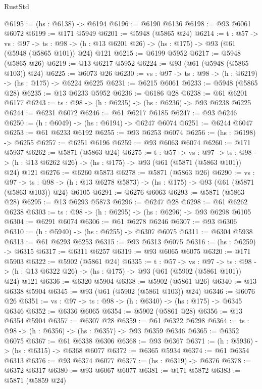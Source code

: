 \begin{lexlean}{RustStd}
\begin{coremodule}
@6195 := (hs : @6138) -> @6194
@6196 := @6190 @6136
@6198 := @93 @6061 @6072
@6199 := @171 @5949
@6201 := @5948 (@5865 @24)
@6214 := {t : @57} ->
  {vs : @97} ->
  {ts : @98} -> (h : @13 @6201 @26) -> (hs : @175) -> @93 (@61 (@5948 (@5865 @101)) @24) @121
@6215 := @6199 @5952
@6217 := @5948 (@5865 @26)
@6219 := @13 @6217 @5952
@6224 := @93 (@61 (@5948 (@5865 @103)) @24)
@6225 := @6073 @26
@6230 := {vs : @97} -> {ts : @98} -> (h : @6219) -> (hs : @175) -> @6224 @6225
@6231 := @6215 @6061
@6233 := @5948 (@5865 @28)
@6235 := @13 @6233 @5952
@6236 := @6186 @28
@6238 := @61 @6201 @6177
@6243 := {ts : @98} -> (h : @6235) -> (hs : @6236) -> @93 @6238 @6225
@6244 := @6231 @6072
@6246 := @61 @6217 @6185
@6247 := @93 @6246
@6250 := (h : @6049) -> (hs : @6194) -> @6247 @6074
@6251 := @6244 @6047
@6253 := @61 @6233 @6192
@6255 := @93 @6253 @6074
@6256 := (hs : @6198) -> @6255
@6257 := @6251 @6196
@6259 := @93 @6063 @6074
@6260 := @171 @5937
@6262 := @5871 (@5863 @24)
@6275 := {t : @57} ->
  {vs : @97} ->
  {ts : @98} -> (h : @13 @6262 @26) -> (hs : @175) -> @93 (@61 (@5871 (@5863 @101)) @24) @121
@6276 := @6260 @5873
@6278 := @5871 (@5863 @26)
@6290 := {vs : @97} ->
  {ts : @98} -> (h : @13 @6278 @5873) -> (hs : @175) -> @93 (@61 (@5871 (@5863 @103)) @24) @6105
@6291 := @6276 @6063
@6293 := @5871 (@5863 @28)
@6295 := @13 @6293 @5873
@6296 := @6247 @28
@6298 := @61 @6262 @6238
@6303 := {ts : @98} -> (h : @6295) -> (hs : @6296) -> @93 @6298 @6105
@6304 := @6291 @6074
@6306 := @61 @6278 @6246
@6307 := @93 @6306
@6310 := (h : @5940) -> (hs : @6255) -> @6307 @6075
@6311 := @6304 @5938
@6313 := @61 @6293 @6253
@6315 := @93 @6313 @6075
@6316 := (hs : @6259) -> @6315
@6317 := @6311 @6257
@6319 := @93 @6065 @6075
@6320 := @171 @5903
@6322 := @5902 (@5861 @24)
@6335 := {t : @57} ->
  {vs : @97} ->
  {ts : @98} -> (h : @13 @6322 @26) -> (hs : @175) -> @93 (@61 (@5902 (@5861 @101)) @24) @121
@6336 := @6320 @5904
@6338 := @5902 (@5861 @26)
@6340 := @13 @6338 @5904
@6345 := @93 (@61 (@5902 (@5861 @103)) @24)
@6346 := @6076 @26
@6351 := {vs : @97} -> {ts : @98} -> (h : @6340) -> (hs : @175) -> @6345 @6346
@6352 := @6336 @6065
@6354 := @5902 (@5861 @28)
@6356 := @13 @6354 @5904
@6357 := @6307 @28
@6359 := @61 @6322 @6298
@6364 := {ts : @98} -> (h : @6356) -> (hs : @6357) -> @93 @6359 @6346
@6365 := @6352 @6075
@6367 := @61 @6338 @6306
@6368 := @93 @6367
@6371 := (h : @5936) -> (hs : @6315) -> @6368 @6077
@6372 := @6365 @5934
@6374 := @61 @6354 @6313
@6376 := @93 @6374 @6077
@6377 := (hs : @6319) -> @6376
@6378 := @6372 @6317
@6380 := @93 @6067 @6077
@6381 := @171 @5872
@6383 := @5871 (@5859 @24)

\end{coremodule}
\end{lexlean}
